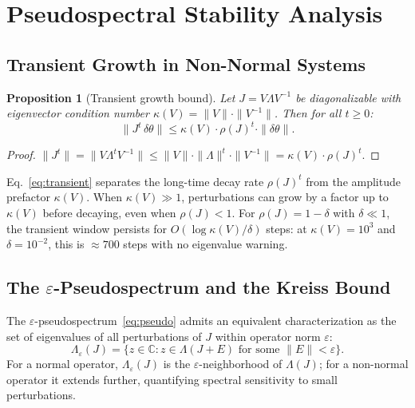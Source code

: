 \documentclass[aps,prresearch,twocolumn,superscriptaddress,longbibliography]{revtex4-2}
\newtheorem{proposition}{Proposition}
\newcommand{\C}{\mathbb{C}}
\begin{document}
\section{Pseudospectral Stability Analysis}
\label{sec:pseudo}

\subsection{Transient Growth in Non-Normal Systems}

\begin{proposition}[Transient growth bound]
\label{prop:transient}
Let $J = V\Lambda V^{-1}$ be diagonalizable with eigenvector condition
number $\kappa(V) = \|V\|\cdot\|V^{-1}\|$.
Then for all $t\geq 0$:
\begin{equation}
\|J^t\,\delta\theta\| \leq \kappa(V)\cdot\rho(J)^t\cdot\|\delta\theta\|.
\label{eq:transient}
\end{equation}
\end{proposition}

\begin{proof}
$\|J^t\| = \|V\Lambda^t V^{-1}\|
         \leq \|V\|\cdot\|\Lambda\|^t\cdot\|V^{-1}\|
         = \kappa(V)\cdot\rho(J)^t$.
\end{proof}

Eq.~\eqref{eq:transient} separates the long-time decay rate $\rho(J)^t$
from the amplitude prefactor $\kappa(V)$.
When $\kappa(V)\gg 1$, perturbations can grow by a factor up to $\kappa(V)$
before decaying, even when $\rho(J) < 1$.
For $\rho(J) = 1-\delta$ with $\delta\ll 1$, the transient window
persists for $O(\log\kappa(V)/\delta)$ steps: at $\kappa(V) = 10^3$ and
$\delta = 10^{-2}$, this is $\approx 700$ steps with no eigenvalue
warning.

\subsection{The $\varepsilon$-Pseudospectrum and the Kreiss Bound}

The $\varepsilon$-pseudospectrum~\eqref{eq:pseudo} admits an equivalent
characterization as the set of eigenvalues of all perturbations of $J$
within operator norm $\varepsilon$:
\begin{equation}
\Lambda_\varepsilon(J) =
\bigl\{z\in\C : z \in \Lambda(J+E)\text{ for some }\|E\|<\varepsilon\bigr\}.
\label{eq:pseudo2}
\end{equation}
For a normal operator, $\Lambda_\varepsilon(J)$ is the $\varepsilon$-neighborhood
of $\Lambda(J)$; for a non-normal operator it extends further, quantifying
spectral sensitivity to small perturbations.
\end{document}
